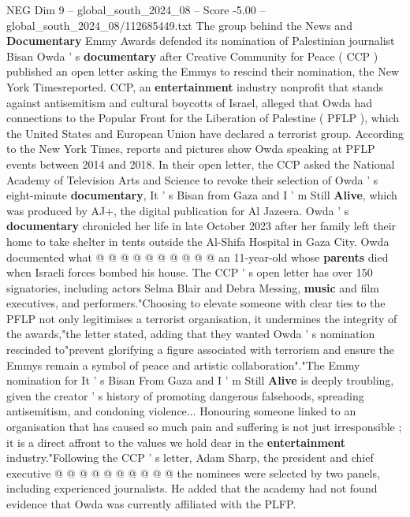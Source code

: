 \begin{textsample}{NEG Dim 9 – global\_south\_2024\_08 – Score -5.00 – global\_south\_2024\_08/112685449.txt}  \label{ex:f9_neg_384}
The group behind the News and \textbf{Documentary} Emmy Awards defended its nomination of Palestinian journalist Bisan Owda ' s \textbf{documentary} after Creative Community for Peace ( CCP ) published an open letter asking the Emmys to rescind their nomination, the New York Timesreported.
CCP, an \textbf{entertainment} industry nonprofit that stands against antisemitism and cultural boycotts of Israel, alleged that Owda had connections to the Popular Front for the Liberation of Palestine ( PFLP ), which the United States and European Union have declared a terrorist group.
According to the New York Times, reports and pictures show Owda speaking at PFLP events between 2014 and 2018.
In their open letter, the CCP asked the National Academy of Television Arts and Science to revoke their selection of Owda ' s eight-minute \textbf{documentary}, It ' s Bisan from Gaza and I ' m Still \textbf{Alive}, which was produced by AJ+, the digital publication for Al Jazeera.
Owda ' s \textbf{documentary} chronicled her life in late October 2023 after her family left their home to take shelter in tents outside the Al-Shifa Hospital in Gaza City.
Owda documented what @ @ @ @ @ @ @ @ @ @ an 11-year-old whose \textbf{parents} died when Israeli forces bombed his house.
The CCP ' s open letter has over 150 signatories, including actors Selma Blair and Debra Messing, \textbf{music} and film executives, and performers."Choosing to elevate someone with clear ties to the PFLP not only legitimises a terrorist organisation, it undermines the integrity of the awards,"the letter stated, adding that they wanted Owda ' s nomination rescinded to"prevent glorifying a figure associated with terrorism and ensure the Emmys remain a symbol of peace and artistic collaboration"."The Emmy nomination for It ' s Bisan From Gaza and I ' m Still \textbf{Alive} is deeply troubling, given the creator ' s history of promoting dangerous falsehoods, spreading antisemitism, and condoning violence...
Honouring someone linked to an organisation that has caused so much pain and suffering is not just irresponsible ; it is a direct affront to the values we hold dear in the \textbf{entertainment} industry."Following the CCP ' s letter, Adam Sharp, the president and chief executive @ @ @ @ @ @ @ @ @ @ the nominees were selected by two panels, including experienced journalists.
He added that the academy had not found evidence that Owda was currently affiliated with the PLFP.

\end{textsample}
